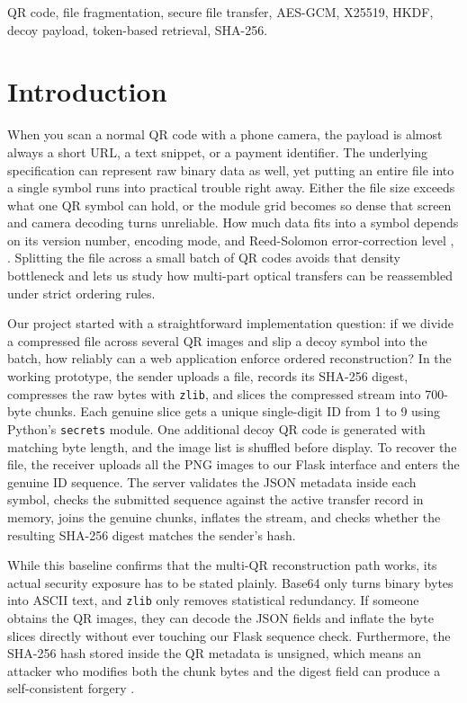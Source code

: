 \documentclass[conference]{IEEEtran}
\begin{document}
\begin{IEEEkeywords}
QR code, file fragmentation, secure file transfer, AES-GCM, X25519, HKDF, decoy payload, token-based retrieval, SHA-256.
\end{IEEEkeywords}

\section{Introduction}
When you scan a normal QR code with a phone camera, the payload is almost always a short URL, a text snippet, or a payment identifier. The underlying specification can represent raw binary data as well, yet putting an entire file into a single symbol runs into practical trouble right away. Either the file size exceeds what one QR symbol can hold, or the module grid becomes so dense that screen and camera decoding turns unreliable. How much data fits into a symbol depends on its version number, encoding mode, and Reed-Solomon error-correction level \cite{iso18004}, \cite{denso}. Splitting the file across a small batch of QR codes avoids that density bottleneck and lets us study how multi-part optical transfers can be reassembled under strict ordering rules.

Our project started with a straightforward implementation question: if we divide a compressed file across several QR images and slip a decoy symbol into the batch, how reliably can a web application enforce ordered reconstruction? In the working prototype, the sender uploads a file, records its SHA-256 digest, compresses the raw bytes with \texttt{zlib}, and slices the compressed stream into 700-byte chunks. Each genuine slice gets a unique single-digit ID from 1 to 9 using Python's \texttt{secrets} module. One additional decoy QR code is generated with matching byte length, and the image list is shuffled before display. To recover the file, the receiver uploads all the PNG images to our Flask interface and enters the genuine ID sequence. The server validates the JSON metadata inside each symbol, checks the submitted sequence against the active transfer record in memory, joins the genuine chunks, inflates the stream, and checks whether the resulting SHA-256 digest matches the sender's hash.

While this baseline confirms that the multi-QR reconstruction path works, its actual security exposure has to be stated plainly. Base64 only turns binary bytes into ASCII text, and \texttt{zlib} only removes statistical redundancy. If someone obtains the QR images, they can decode the JSON fields and inflate the byte slices directly without ever touching our Flask sequence check. Furthermore, the SHA-256 hash stored inside the QR metadata is unsigned, which means an attacker who modifies both the chunk bytes and the digest field can produce a self-consistent forgery \cite{fips180}.
\end{document}
